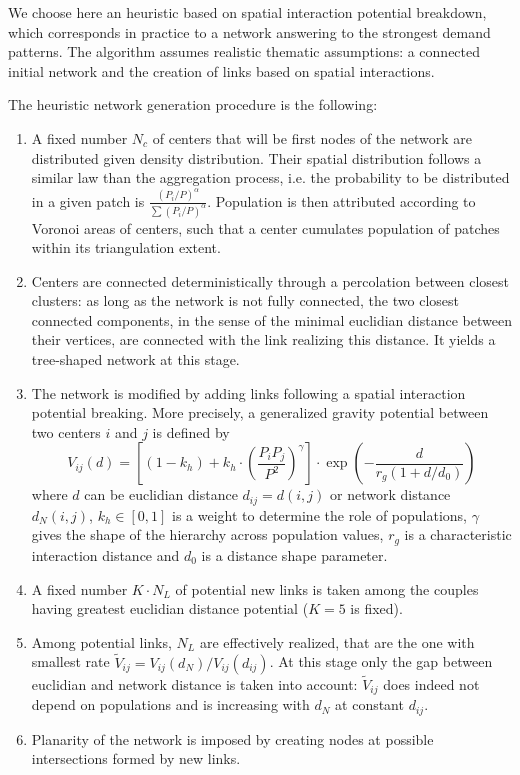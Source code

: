 \documentclass{article}
\begin{document}
We choose here an heuristic based on spatial interaction potential breakdown, which corresponds in practice to a network answering to the strongest demand patterns. The algorithm assumes realistic thematic assumptions: a connected initial network and the creation of links based on spatial interactions.


The heuristic network generation procedure is the following:
\begin{enumerate}
\item A fixed number $N_c$ of centers that will be first nodes of the network are distributed given density distribution. Their spatial distribution follows a similar law than the aggregation process, i.e. the probability to be distributed in a given patch is $\frac{(P_i/P)^{\alpha}}{\sum (P_i/P)^{\alpha}}$. Population is then attributed according to Voronoi areas of centers, such that a center cumulates population of patches within its triangulation extent.
\item Centers are connected deterministically through a percolation between closest clusters: as long as the network is not fully connected, the two closest connected components, in the sense of the minimal euclidian distance between their vertices, are connected with the link realizing this distance. It yields a tree-shaped network at this stage.
\item The network is modified by adding links following a spatial interaction potential breaking. More precisely, a generalized gravity potential between two centers $i$ and $j$ is defined by
\begin{equation}
V_{ij}(d) = \left[ (1 - k_h) + k_h \cdot \left( \frac{P_i P_j}{P^2} \right)^{\gamma} \right]\cdot \exp{\left( -\frac{d}{r_g (1 + d/d_0)} \right)}
\end{equation}
where $d$ can be euclidian distance $d_{ij}=d(i,j)$ or network distance $d_N(i,j)$, $k_h \in [0,1]$ is a weight to determine the role of populations, $\gamma$ gives the shape of the hierarchy across population values, $r_g$ is a characteristic interaction distance and $d_0$ is a distance shape parameter.
\item A fixed number $K\cdot N_L$ of potential new links is taken among the couples having greatest euclidian distance potential ($K=5$ is fixed).
\item Among potential links, $N_L$ are effectively realized, that are the one with smallest rate $\tilde{V}_{ij} = V_{ij}(d_N)/V_{ij}(d_{ij})$. At this stage only the gap between euclidian and network distance is taken into account: $\tilde{V}_{ij}$ does indeed not depend on populations and is increasing with $d_N$ at constant $d_{ij}$.
\item Planarity of the network is imposed by creating nodes at possible intersections formed by new links.
\end{enumerate}
\end{document}

